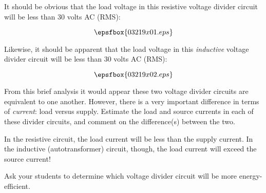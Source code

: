 

It should be obvious that the load voltage in this resistive voltage divider circuit will be less than 30 volts AC (RMS):

$$\epsfbox{03219x01.eps}$$

Likewise, it should be apparent that the load voltage in this {\it inductive} voltage divider circuit will be less than 30 volts AC (RMS):

$$\epsfbox{03219x02.eps}$$

From this brief analysis it would appear these two voltage divider circuits are equivalent to one another.  However, there is a very important difference in terms of {\it current}: load versus supply.  Estimate the load and source currents in each of these divider circuits, and comment on the difference(s) between the two.







In the resistive circuit, the load current will be less than the supply current.  In the inductive (autotransformer) circuit, though, the load current will exceed the source current!







Ask your students to determine which voltage divider circuit will be more energy-efficient.




